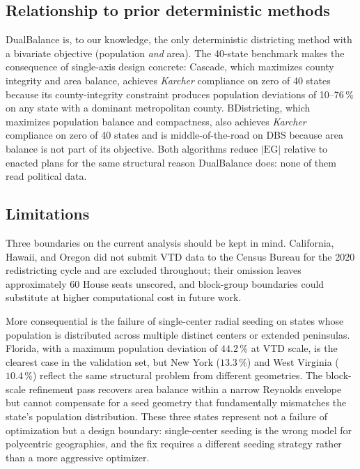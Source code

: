 \subsection{Relationship to prior deterministic methods}
\label{sec:discussion-prior}

DualBalance is, to our knowledge, the only deterministic districting
method with a bivariate objective (population \emph{and} area). The
40-state benchmark makes the consequence of single-axis design
concrete: Cascade, which maximizes county integrity and area balance,
achieves \textit{Karcher} compliance on zero of 40 states because its
county-integrity constraint produces population deviations of
10--76\,\% on any state with a dominant metropolitan county.
BDistricting, which maximizes population balance and compactness,
also achieves \textit{Karcher} compliance on zero of 40 states and
is middle-of-the-road on DBS because area balance is not part of
its objective. Both algorithms reduce $|\mathrm{EG}|$ relative to
enacted plans for the same structural reason DualBalance does: none
of them read political data.

\subsection{Limitations}
\label{sec:discussion-limitations}

Three boundaries on the current analysis should be kept in mind.
California, Hawaii, and Oregon did not submit VTD data to the Census
Bureau for the 2020 redistricting cycle and are excluded throughout;
their omission leaves approximately 60 House seats unscored, and
block-group boundaries could substitute at higher computational cost
in future work.

More consequential is the failure of single-center radial seeding
on states whose population is distributed across multiple distinct
centers or extended peninsulas. Florida, with a maximum population
deviation of $44.2\,\%$ at VTD scale, is the clearest case in the
validation set, but New York ($13.3\,\%$) and West Virginia
($10.4\,\%$) reflect the same structural problem from different
geometries. The block-scale refinement pass recovers area balance
within a narrow Reynolds envelope but cannot compensate for a
seed geometry that fundamentally mismatches the state's population
distribution. These three states represent not a failure of
optimization but a design boundary: single-center seeding is the
wrong model for polycentric geographies, and the fix requires a
different seeding strategy rather than a more aggressive optimizer.

